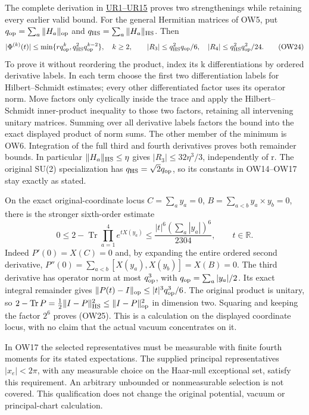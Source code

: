 \documentclass[11pt]{article}
\begin{document}
The complete derivation in \href{https://github.com/KokunoYumeto/yang-mills-interacting-workbench/blob/main/yang-mills/continuations/20261011-central-signs-shrinking-window/ORDERED_WILSON_INDEPENDENT_REVIEW.md}{UR1–UR15} proves two strengthenings while retaining every earlier valid bound. For the general Hermitian matrices of OW5, put \(q_{\rm op}=\sum_a\|H_a\|_{\rm op}\) and \(q_{\rm HS}=\sum_a\|H_a\|_{\rm HS}\). Then
\[
 |\Phi^{(k)}(t)|\le\min\{r q_{\rm op}^k,
                  q_{\rm HS}^2q_{\rm op}^{k-2}\},\quad k\ge2,
 \qquad
 |R_3|\le q_{\rm HS}^2q_{\rm op}/6,\quad
 |R_4|\le q_{\rm HS}^2q_{\rm op}^2/24.
 \tag{OW24}
\]
To prove it without reordering the product, index its k differentiations by ordered derivative labels. In each term choose the first two differentiation labels for Hilbert–Schmidt estimates; every other differentiated factor uses its operator norm. Move factors only cyclically inside the trace and apply the Hilbert–Schmidt inner-product inequality to those two factors, retaining all intervening unitary matrices. Summing over all derivative labels factors the bound into the exact displayed product of norm sums. The other member of the minimum is OW6. Integration of the full third and fourth derivatives proves both remainder bounds. In particular \(\|H_a\|_{\rm HS}\le\eta\) gives \(|R_3|\le32\eta^3/3\), independently of r. The original SU(2) specialization has \(q_{\rm HS}=\sqrt2q_{\rm op}\), so its constants in OW14–OW17 stay exactly as stated.

On the exact original-coordinate locus \(C=\sum_a y_a=0\), \(B=\sum_{a<b}y_a\times y_b=0\), there is the stronger sixth-order estimate
\[
 0\le 2-\operatorname{Tr}\prod_{a=1}^4e^{tX(y_a)}
 \le \frac{|t|^6(\sum_a|y_a|)^6}{2304},\qquad t\in\mathbb R.
 \tag{OW25}
\]
Indeed \(P'(0)=X(C)=0\) and, by expanding the entire ordered second derivative, \(P''(0)=\sum_{a<b}[X(y_a),X(y_b)]=X(B)=0\). The third derivative has operator norm at most \(q_{\rm op}^3\), with \(q_{\rm op}=\sum_a|y_a|/2\). Its exact integral remainder gives \(\|P(t)-I\|_{\rm op}\le|t|^3q_{\rm op}^3/6\). The original product is unitary, so \(2-\operatorname{Tr}P=\tfrac12\|I-P\|_{\rm HS}^2\le\|I-P\|_{\rm op}^2\) in dimension two. Squaring and keeping the factor \(2^6\) proves (OW25). This is a calculation on the displayed coordinate locus, with no claim that the actual vacuum concentrates on it.

In OW17 the selected representatives must be measurable with finite fourth moments for its stated expectations. The supplied principal representatives \(|x_e|<2\pi\), with any measurable choice on the Haar-null exceptional set, satisfy this requirement. An arbitrary unbounded or nonmeasurable selection is not covered. This qualification does not change the original potential, vacuum or principal-chart calculation.
\end{document}
